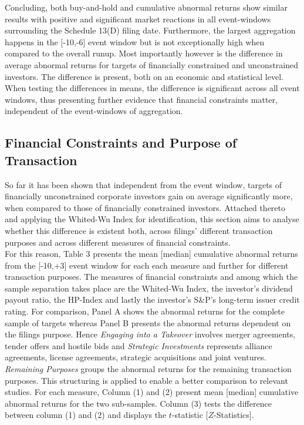 \documentclass[12pt]{article}
\begin{document}
Concluding, both buy-and-hold and cumulative abnormal returns show similar results with positive and significant market reactions in all event-windows surrounding the Schedule 13(D) filing date. Furthermore, the largest aggregation happens in the [-10,-6] event window but is not exceptionally high when compared to the overall runup. Most importantly however is the difference in average abnormal returns for targets of financially constrained and unconstrained investors. The difference is present, both on an economic and statistical level. When testing the differences in means, the difference is significant across all event windows, thus presenting further evidence that financial constraints matter, independent of the event-windows of aggregation.

\subsection{Financial Constraints and Purpose of Transaction}
So far it has been shown that independent from the event window, targets of financially unconstrained corporate investors gain on average significantly more, when compared to those of financially constrained investors. Attached thereto and applying the Whited-Wu Index for identification, this section aims to analyse whether this difference is existent both, across filings' different transaction purposes and across different measures of financial constraints.\\
For this reason, Table 3 presents the mean [median] cumulative abnormal returns from the [-10,+3] event window for each each measure and further for different transaction purposes. The measures of financial constraints and among which the sample separation takes place are the Whited-Wu Index, the investor's dividend payout ratio, the HP-Index and lastly the investor's S\&P's long-term issuer credit rating. For comparison, Panel A shows the abnormal returns for the complete sample of targets whereas Panel B presents the abnormal returns dependent on the filings purpose. Hence \emph{Engaging into a Takeover} involves merger agreements, tender offers and hostile bids and \emph{Strategic Investments} represents alliance agreements, license agreements, strategic acquisitions and joint ventures. \emph{Remaining Purposes} groups the abnormal returns for the remaining transaction purposes. This structuring is applied to enable a better comparison to relevant studies. For each measure, Column (1) and (2) present mean [median] cumulative abnormal returns for the two sub-samples. Column (3) tests the difference between column (1) and (2) and displays the  $t$-statistic [$Z$-Statistics].
\end{document}
